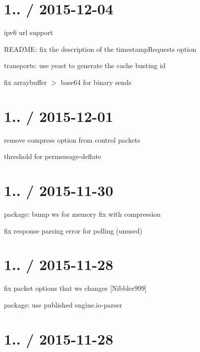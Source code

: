 \section*{1.. / 2015-\/12-\/04 }


\begin{DoxyItemize}
\item ipv6 url support
\item R\+E\+A\+D\+ME\+: fix the description of the {\ttfamily timestamp\+Requests} option
\item transports\+: use {\ttfamily yeast} to generate the cache busting id
\item fix arraybuffer $>$ base64 for binary sends
\end{DoxyItemize}

\section*{1.. / 2015-\/12-\/01 }


\begin{DoxyItemize}
\item remove compress option from control packets
\item threshold for permessage-\/deflate
\end{DoxyItemize}

\section*{1.. / 2015-\/11-\/30 }


\begin{DoxyItemize}
\item package\+: bump {\ttfamily ws} for memory fix with compression
\item fix response parsing error for polling (unused)
\end{DoxyItemize}

\section*{1.. / 2015-\/11-\/28 }


\begin{DoxyItemize}
\item fix packet options that {\ttfamily ws} changes \mbox{[}Nibbler999\mbox{]}
\item package\+: use published {\ttfamily engine.\+io-\/parser}
\end{DoxyItemize}

\section*{1.. / 2015-\/11-\/28 }


